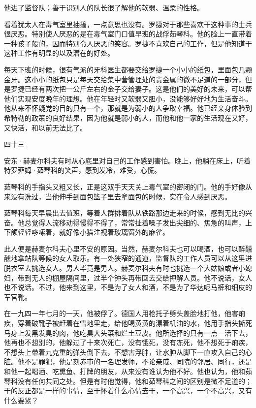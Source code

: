 他进了监督队；善于识别人的队长很了解他的软弱、温柔的性格。

看着犹太人在毒气室里抽搐，一点意思也没有。罗捷对于那些喜欢干这种事的士兵很厌恶。特别使人厌恶的是在毒气室门口值早班的战俘茹琴科。他的脸上一直带着一种孩子般的，因而特别令人厌恶的笑容。罗捷不喜欢自己的工作，但是他知道干这种工作有明显的以及潜在的好处。

每天下班的时候，很有气派的牙科医生都要交给罗捷一个小小的纸包，里面包几颗金牙。这小小的纸包只是每天交给集中营管理处的贵金属的微不足道的一部分，但是罗捷已经有两次把一公斤左右的金子交给妻子。这是他们的美好的未来，可以帮他们实现安度晩年的理想。他在年轻时又软弱又胆小，没能够好好地为生活奋斗。他从来不怀疑党的目的只有一个，那就是为弱小的人争取幸福。他已经亲身体验到希特勒的政策的良好结果，因为他就是弱小的人，而他和他一家的生活现在又好，又快活，和以前无法比了。

四十三

安东·赫麦尔科夫有时从心底里对自己的工作感到害怕。晚上，他躺在床上，听着特罗菲姆·茹琴科的笑声，感到发冷，难受，心慌。

茹琴科的手指头又粗又长，正是这双手天天关上毒气室的密闭的门。他的手好像从来没有洗过，当他伸手到面包篮子里去拿面包的时候，实在令人感到厌恶。

茹琴科每天早晨出去值班，等着人群排着队从铁路那边走来的时候，感到无比的兴奋。他总觉得人流移动得慢得不得了，常常扯着嗓子发出尖细的、焦急的叫声，上下颌轻轻哆嗦着，就好像小猫注视着玻璃窗外的麻雀。

此人便是赫麦尔科夫心里不安的原因。当然，赫麦尔科夫也可以喝酒，也可以醉醺醺地拿站队等候的女人取乐。有一处狭窄的通道，监督队的工作人员可以从这里进脱衣室去挑选女人。男人毕竟是男人。赫麦尔科夫有时也挑选一个大姑娘或者小媳妇，带到无人的棚屋隔间里，过半个钟头再带回去交给押解人员。他不说话，女人也不说话。不过，他来到这里，不是为了女人和酒，不是为了华达呢马裤和细皮的军官靴。

在一九四一年七月的一天，他被俘了。德国人用枪托子劈头盖脸地打他，他害痢疾，穿着破靴子被赶着在雪地里走，给他喝黄黄的漂着机油的水，他用手指头撕死马身上发黑发臭的肉，他吃臭大头菜和烂土豆皮。他所选择的只有一点—活下去，他再也不想别的，他躲过了十来次死亡，没有饿死，没有冻死，他不想死于痢疾，不想头上带着九克重的弹头倒下去，不想害浮肿，让水肿从脚下一直攻入自己的心脏。他不是罪犯，他是刻赤市的一名理发师，不论亲戚、同院的邻居、同行，还是和他一起喝酒、吃熏鱼、打牌的朋友，从来没有谁认为他不好。他也认为，他和茹琴科没有任何共同之处。但是有时他觉得，他和茹琴科之间的区别是微不足道的；干的反正都是一样的事情，至于怀着什么心情去干，一个高兴，一个不高兴，又有什么要紧？

